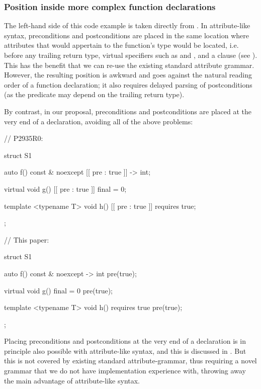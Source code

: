 \subsubsection{Position inside more complex function declarations}

The left-hand side of this code example is taken directly from \cite{P2935R0}. In attribute-like syntax, preconditions and postconditions are placed in the same location where attributes that would appertain to the function’s type would be located, i.e. before any trailing return type, virtual specifiers such as  and , and a  clause (see \cite{P2935R0}). This has the benefit that we can re-use the existing standard attribute grammar. However, the resulting position is awkward and goes against the natural reading order of a function declaration; it also requires delayed parsing of postconditions (as the predicate may depend on the trailing return type).

By contrast, in our proposal, preconditions and postconditions are placed at the very end of a declaration, avoiding all of the above problems:
\vspace{5mm}

\begin{minipage}{8cm}
\begin{codeblock}
// P2935R0:

struct S1
{
  auto f() const & noexcept
    [[ pre : true ]] -> int;
    
  virtual void g()
    [[ pre : true ]] final = 0;
  
  template <typename T>
  void h()
    [[ pre : true ]] requires true;
};
\end{codeblock}
\end{minipage}
\begin{minipage}{8cm}
\begin{codeblock}
// This paper:

struct S1
{
  auto f() const & noexcept -> int
    pre(true);
    
  virtual void g() final = 0
    pre(true);

  template <typename T>
  void h() requires true
    pre(true);
};
\end{codeblock}
\end{minipage}
\vspace{3mm}

Placing preconditions and postconditions at the very end of a declaration is in principle also possible with attribute-like syntax, and this is discussed in \cite{P2935R0}. But this is not covered by existing standard attribute-grammar, thus requiring a novel grammar that we do not have implementation experience with, throwing away the main advantage of attribute-like syntax.
